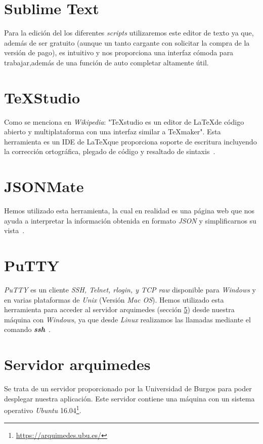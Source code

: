 \section{Sublime Text}
Para la edición del los diferentes \textit{scripts} utilizaremos este editor de texto ya que, además de ser gratuito (aunque un tanto cargante con solicitar la compra de la versión de pago), es intuitivo y nos proporciona una interfaz cómoda para trabajar,además de una función de auto completar altamente útil.

\section{\TeX Studio}
Como se menciona en \textit{Wikipedia}: "\TeX studio es un editor de \LaTeX de código abierto y multiplataforma con una interfaz similar a \TeX maker". Esta herramienta es un IDE de \LaTeX que proporciona soporte de escritura incluyendo la corrección ortográfica, plegado de código y resaltado de sintaxis~\cite{wiki:texstudio}.


\section{JSONMate}
Hemos utilizado esta herramienta, la cual en realidad es una página web que nos ayuda a interpretar la información obtenida en formato \textit{JSON} y simplificarnos su vista~\cite{json:jsnomate}.

\section{PuTTY}
\textit{PuTTY} es un cliente \textit{SSH, Telnet, rlogin, y TCP raw} disponible para \textit{Windows} y en varias plataformas de \textit{Unix} (Versión \textit{Mac OS}). Hemos utilizado esta herramienta para acceder al servidor arquimedes (sección \ref{sec:arquimedes}) desde nuestra máquina con \textit{Windows}, ya que desde \textit{Linux} realizamos las llamadas mediante el comando \textit{\textbf{ssh}}~\cite{wiki:putty}.

\section{Servidor arquimedes}\label{sec:arquimedes}
Se trata de un servidor proporcionado por la Universidad de Burgos para poder desplegar nuestra aplicación. Este servidor contiene una máquina con un sistema operativo \textit{Ubuntu} 16.04\footnote{\url{https://arquimedes.ubu.es/}}.

